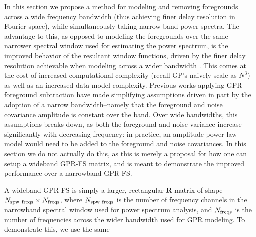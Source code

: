 \documentclass[a4paper,fleqn,usenatbib]{mnras}
\def\R{\boldsymbol{R}}
\begin{document}
In this section we propose a method for modeling and removing foregrounds across a wide frequency bandwidth (thus achieving finer delay resolution in Fourier space), while simultaneously taking narrow-band power spectra.
The advantage to this, as opposed to modeling the foregrounds over the same narrower spectral window used for estimating the power spectrum, is the improved behavior of the resultant window functions, driven by the finer delay resolution achievable when modeling across a wider bandwidth \citep{Parsons2014}.
This comes at the cost of increased computational complexity (recall GP's naively scale as $N^3$) as well as an increased data model complexity.
Previous works applying GPR foreground subtraction have made simplifying assumptions driven in part by the adoption of a narrow bandwidth--namely that the foreground and noise covariance amplitude is constant over the band.
Over wide bandwidths, this assumptions breaks down, as both the foreground and noise variance increase significantly with decreasing frequency: in practice, an amplitude power law model would need to be added to the foreground and noise covariances.
In this section we do not actually do this, as this is merely a proposal for how one can setup a wideband GPR-FS matrix, and is meant to demonstrate the improved performance over a narrowband GPR-FS.

A wideband GPR-FS is simply a larger, rectangular $\R$ matrix of shape $N_{\rm spw\ freqs}\times N_{\rm freqs}$, where $N_{\rm spw\ freqs}$ is the number of frequency channels in the narrowband spectral window used for power spectrum analysis, and $N_{\rm freqs}$ is the number of frequencies across the wider bandwidth used for GPR modeling.
To demonstrate this, we use the same 
\end{document}
